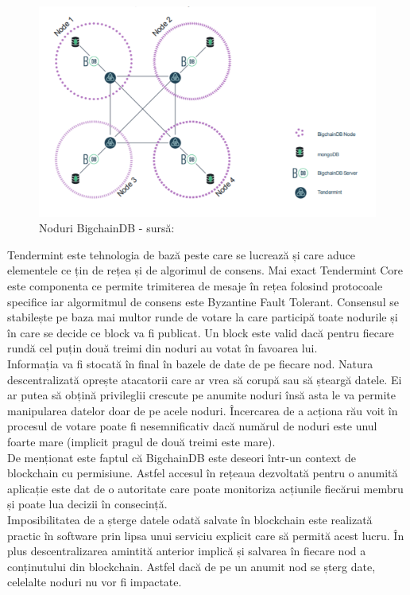 \begin{figure}[H] 
\centering
\includegraphics[scale=0.9]{Images/BCDB_Nodes.png}
\caption{Noduri BigchainDB - sursă: \cite{BigchainDB_Art}}
\end{figure}

Tendermint \cite{Tendermint} este tehnologia de bază peste care se lucrează și care aduce elementele ce țin de rețea și de algorimul de consens. Mai exact Tendermint Core este componenta ce permite trimiterea de mesaje în rețea folosind protocoale specifice iar algormitmul de consens este Byzantine Fault Tolerant. Consensul se stabilește pe baza mai multor runde de votare la care participă toate nodurile și în care se decide ce block va fi publicat. Un block este valid dacă pentru fiecare rundă cel puțin două treimi din noduri au votat în favoarea lui.\\

Informația va fi stocată în final în bazele de date de pe fiecare nod. Natura descentralizată oprește atacatorii care ar vrea să corupă sau să șteargă datele. Ei ar putea să obțină privileglii crescute pe anumite noduri însă asta le va permite manipularea datelor doar de pe acele noduri. Încercarea de a acționa rău voit în procesul de votare poate fi nesemnificativ dacă numărul de noduri este unul foarte mare (implicit pragul de două treimi este mare).\\

De menționat este faptul că BigchainDB este deseori într-un context de blockchain cu permisiune. Astfel accesul în rețeaua dezvoltată pentru o anumită aplicație este dat de o autoritate care poate monitoriza acțiunile fiecărui membru și poate lua decizii în consecință.\\

Imposibilitatea de a șterge datele odată salvate în blockchain este realizată practic în software prin lipsa unui serviciu explicit care să permită acest lucru. În plus descentralizarea amintită anterior implică și salvarea în fiecare nod a conținutului din blockchain. Astfel dacă de pe un anumit nod se șterg date, celelalte noduri nu vor fi impactate.\\

